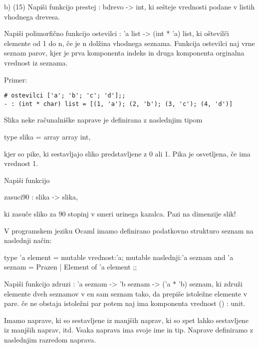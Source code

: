 \begin{ex}
b) (15) Napi\v si funkcijo prestej : bdrevo -> int, ki se\v steje vrednosti podane  v listih vhodnega drevesa. 

\end{ex} \begin{ex}
Napi\v si polimorfi\v cno funkcijo ostevilci : 'a list -> (int * 'a) list, ki o\v stevil\v ci elemente od 1 do n, \v ce je n dol\v zina vhodnega seznama. Funkcija ostevilci naj vrne seznam parov, kjer je prva komponenta indeks in druga komponenta orginalna vrednost iz seznama.

Primer:

\begin{verbatim}
# ostevilci ['a'; 'b'; 'c'; 'd'];; 
- : (int * char) list = [(1, 'a'); (2, 'b'); (3, 'c'); (4, 'd')]

\end{verbatim}

\end{ex} \begin{ex}
Slika neke ra\v cunalni\v ske naprave je definirana z naslednjim tipom 

type slika = array array int,

kjer so pike, ki sestavljajo sliko predstavljene z 0 ali 1. Pika je osvetljena, \v ce ima 
vrednost 1. 

Napi\v si funkcijo 

zasuci90 : slika -> slika, 

ki zasu\v ce sliko za 90 stopinj v smeri urinega kazalca. Pazi na dimenzije slik! 


\end{ex} \begin{ex}
V programskem jeziku Ocaml imamo definirano podatkovno strukturo seznam na 
naslednji na\v cin: 

type 'a element = { 
   mutable vrednost:'a; 
   mutable naslednji:'a seznam 
} 
and 'a seznam = Prazen | Element of 'a element ;; 

Napi\v si funkcijo zdruzi : 'a seznam -> 'b seznam -> ('a * 'b) seznam, ki zdru\v zi elemente dveh seznamov v en sam seznam tako, da prepi\v se istole\v zne elemente v  pare. \v ce ne obstaja istole\v zni par potem naj ima komponenta vrednost () : unit.

 
\end{ex} \begin{ex}
Imamo naprave, ki so sestavljene iz manj\v sih naprav, ki so spet lahko 
sestavljene iz manj\v sih naprav, itd. Vsaka naprava ima svoje ime in tip. Naprave definiramo z naslednjim razredom naprava. 


\end{ex}
